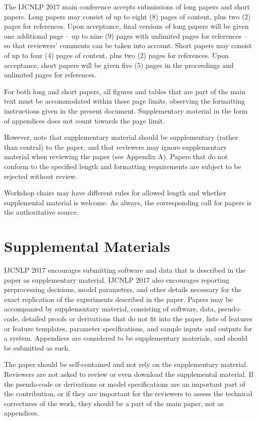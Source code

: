 \documentclass[11pt,letterpaper]{article}
\begin{document}
The IJCNLP 2017 main conference accepts submissions of long papers and short papers. Long papers may consist of up to eight (8) pages of content, plus two (2) pages for references. Upon acceptance, final versions of long papers will be given one additional page – up to nine (9) pages with unlimited pages for references – so that reviewers’ comments can be taken into account. Short papers may consist of up to four (4) pages of content, plus two (2) pages for references. Upon acceptance, short papers will be given five (5) pages in the proceedings and unlimited pages for references. 

For both long and short papers, all figures and tables that are part of the main text must be accommodated within these page limits, observing the formatting instructions given in the present document. Supplementary material in the form of appendices does not count towards the page limit.

However, note that supplementary material should be supplementary (rather than central) to the paper, and that reviewers may ignore supplementary material when reviewing the paper (see Appendix A). Papers that do not conform to the specified length and formatting requirements are subject to be rejected without review.

Workshop chairs may have different rules for allowed length and whether supplemental material is welcome.  As always, the corresponding call for papers is the authoritative source.

\section{Supplemental Materials}
\label{sec:supplemental}

IJCNLP 2017 encourages submitting software and data that is described in the paper as supplementary material. IJCNLP 2017 also encourages reporting preprocessing decisions, model parameters, and other details necessary for the exact replication of the experiments described in the paper. Papers may be accompanied by supplementary material, consisting of software, data, pseudo-code, detailed proofs or derivations that do not fit into the paper, lists of features or feature templates, parameter specifications, and sample inputs and outputs for a system. Appendices are considered to be supplementary materials, and should be submitted as such.

The paper should be self-contained and not rely on the supplementary material. Reviewers are not asked to review or even download the supplemental material. If the pseudo-code or derivations or model specifications are an important part of the contribution, or if they are important for the reviewers to assess the technical correctness of the work, they should be a part of the main paper, not as appendices.
\end{document}

